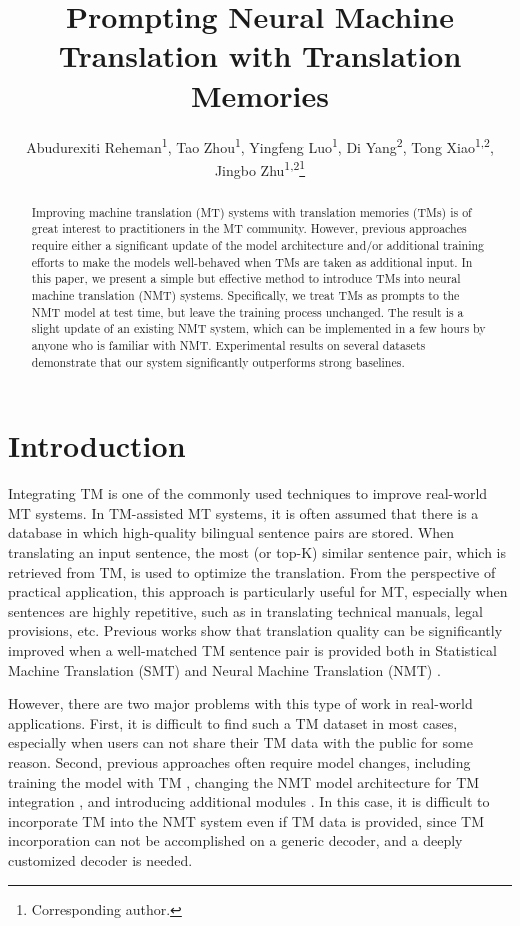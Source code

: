 \documentclass[letterpaper]{article} %
\title{Prompting Neural Machine Translation with Translation Memories}
\author{
    Abudurexiti Reheman\textsuperscript{\rm 1},
    Tao Zhou\textsuperscript{\rm 1},
    Yingfeng Luo\textsuperscript{\rm 1},
    Di Yang\textsuperscript{\rm 2},
    Tong Xiao\textsuperscript{\rm 1,\rm 2},
    Jingbo Zhu\textsuperscript{\rm 1,\rm 2}\thanks{Corresponding author.}
}
\begin{document}
\maketitle

\begin{abstract}
Improving machine translation (MT) systems with translation memories (TMs) is of great interest to practitioners in the MT community. However, previous approaches require either a significant update of the model architecture and/or additional training efforts to make the models well-behaved when TMs are taken as additional input. In this paper, we present a simple but effective method to introduce TMs into neural machine translation (NMT) systems. Specifically, we treat TMs as prompts to the NMT model at test time, but leave the training process unchanged. The result is a slight update of an existing NMT system, which can be implemented in a few hours by anyone who is familiar with NMT. Experimental results on several datasets demonstrate that our system significantly outperforms strong baselines.
\end{abstract}


\section{Introduction}

Integrating TM is one of the commonly used techniques to improve real-world MT systems. In TM-assisted MT systems, it is often assumed that there is a database in which high-quality bilingual sentence pairs are stored. When translating an input sentence, the most (or top-K) similar sentence pair, which is retrieved from TM, is used to optimize the translation. From the perspective of practical application, this approach is particularly useful for MT, especially when sentences are highly repetitive, such as in translating technical manuals, legal provisions, etc. Previous works show that translation quality can be significantly improved when a well-matched TM sentence pair is provided both in Statistical Machine Translation (SMT) \cite{ma2011consistent,wang2013integrating,li2014discriminative} and Neural Machine Translation (NMT) \cite{gu2018search,khandelwal2020nearest}.

However, there are two major problems with this type of work in real-world applications. First, it is difficult to find such a TM dataset in most cases, especially when users can not share their TM data with the public for some reason. Second, previous approaches often require model changes, including training the model with TM \cite{bulte2019neural,hossain2020simple,xu2020boosting}, changing the NMT model architecture for TM integration \cite{gu2018search,bapna2019non,xia2019graph,he2021fast}, and introducing additional modules \cite{zhang2018guiding,he2019word,khandelwal2020nearest}. In this case, it is difficult to incorporate TM into the NMT system even if TM data is provided, since TM incorporation can not be accomplished on a generic decoder, and a deeply customized decoder is needed.
\end{document}
